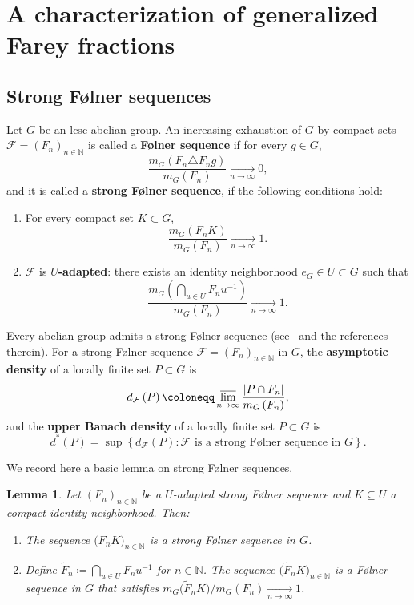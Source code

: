 \documentclass{amsart}
\numberwithin{equation}{subsection}
\newtheorem{lem}[thm]{Lemma}
\theoremstyle{remark}
\begin{document}
\section{A characterization of generalized Farey fractions}

\subsection{Strong F\o lner sequences}\label{sct:Banach}

Let \(G\) be an lcsc abelian group. An increasing exhaustion of \(G\) by compact sets \(\mathcal{F}=\left(F_{n}\right)_{n\in\mathbb{N}}\) is called a {\bf F\o lner sequence} if for every \(g\in G\),
\[\frac{m_{G}\left(F_{n}\triangle F_{n}g\right)}{m_{G}\left(F_{n}\right)}\xrightarrow[n\to\infty]{}0,\]
and it is called a {\bf strong F\o lner sequence}, if the following conditions hold:
\begin{enumerate}
    \item For every compact set \(K\subset G\),
    \[\frac{m_{G}\left(F_{n}K\right)}{m_{G}\left(F_{n}\right)}\xrightarrow[n\to\infty]{}1.\]
    \item \(\mathcal{F}\) is {\bf \(U\)-adapted}: there exists an identity neighborhood \(e_{G}\in U\subset G\) such that
    \[\frac{m_{G}\left(\bigcap\nolimits_{u\in U}F_{n}u^{-1}\right)}{m_{G}\left(F_{n}\right)}\xrightarrow[n\to\infty]{}1.\]
\end{enumerate}
Every abelian group admits a strong F\o lner sequence (see~\cite[\S2.3]{BjFi2024} and the references therein). For a strong F\o lner sequence \(\mathcal{F}=\left(F_{n}\right)_{n\in\mathbb{N}}\) in \(G\), the {\bf asymptotic density} of a locally finite set \(P\subset G\) is
\[d_{\mathcal{F}}\left(P\right)\coloneqq\varlimsup_{n\to\infty}\frac{\left|P\cap F_{n}\right|}{m_{G}\left(F_{n}\right)},\]
and the {\bf upper Banach density} of a locally finite set \(P\subset G\) is
\[d^{\ast}\left(P\right)=\sup\left\{ d_{\mathcal{F}}\left(P\right):\mathcal{F}\text{ is a strong F\o}\text{lner sequence in }G\right\}.\]

We record here a basic lemma on strong F\o lner sequences.

\begin{lem}\label{lem:foln}
Let \(\left(F_{n}\right)_{n\in\mathbb{N}}\) be a \(U\)-adapted strong F\o lner sequence and \(K\subseteq U\) a compact identity neighborhood. Then:
\begin{enumerate}
     \item The sequence \(\big(F_{n}K\big)_{n\in\mathbb{N}}\) is a strong F\o lner sequence in \(G\).
     \item Define \(\widetilde{F}_{n}\coloneqq\bigcap\nolimits_{u\in U}F_{n}u^{-1}\) for \(n\in\mathbb{N}\). The sequence \(\big(\widetilde{F}_{n}K\big)_{n\in\mathbb{N}}\) is a F\o lner sequence in \(G\) that satisfies \(m_{G}\big(\widetilde{F}_{n}K\big)/m_{G}\left(F_{n}\right)\xrightarrow[n\to\infty]{}1\).
\end{enumerate}
\end{lem}
\end{document}
